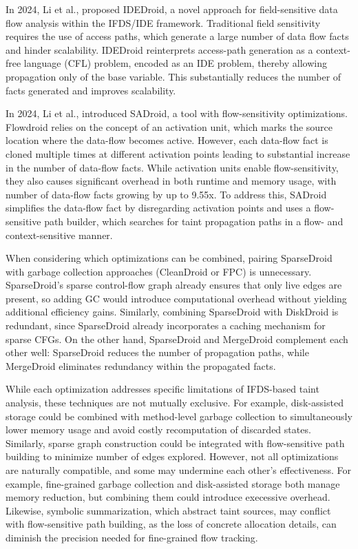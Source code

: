 In 2024, Li et al., \cite{li2024boosting} proposed IDEDroid, a novel approach for field-sensitive data flow analysis within the IFDS/IDE framework. 
Traditional field sensitivity requires the use of access paths, which generate a large number of data flow facts and hinder scalability. 
IDEDroid reinterprets access-path generation as a context-free language (CFL) problem, encoded as an IDE problem, thereby allowing propagation only of the base variable. 
This substantially reduces the number of facts generated and improves scalability.

In 2024, Li et al., \cite{li2024boostingmultisolver} introduced SADroid, a tool with flow-sensitivity optimizations. 
Flowdroid relies on the concept of an activation unit, which marks the source location where the data-flow becomes active.
However, each data-flow fact is cloned multiple times at different activation points leading to substantial increase in the number of data-flow facts.
While activation units enable flow-sensitivity, they also causes significant overhead in both runtime and memory usage, with number of data-flow facts growing by up to 9.55x.
To address this, SADroid simplifies the data-flow fact by disregarding activation points and uses a flow-sensitive path builder, which searches for taint propagation paths in a flow- and context-sensitive manner.


When considering which optimizations can be combined, pairing SparseDroid with garbage collection approaches (CleanDroid or FPC) is unnecessary. 
SparseDroid’s sparse control-flow graph already ensures that only live edges are present, so adding GC would introduce computational overhead without yielding additional efficiency gains. 
Similarly, combining SparseDroid with DiskDroid is redundant, since SparseDroid already incorporates a caching mechanism for sparse CFGs. 
On the other hand, SparseDroid and MergeDroid complement each other well: SparseDroid reduces the number of propagation paths, while MergeDroid eliminates redundancy within the propagated facts.

While each optimization addresses specific limitations of IFDS-based taint analysis, these techniques are not mutually exclusive.
For example, disk-assisted storage could be combined with method-level garbage collection to simultaneously lower memory usage and avoid costly recomputation of discarded states.
Similarly, sparse graph construction could be integrated with flow-sensitive path building to minimize number of edges explored.
However, not all optimizations are naturally compatible, and some may undermine each other's effectiveness. 
For example, fine-grained garbage collection and disk-assisted storage both manage memory reduction, but combining them could introduce execessive overhead.
Likewise, symbolic summarization, which abstract taint sources, may conflict with flow-sensitive path building, as the loss of concrete allocation details, can diminish the precision needed for fine-grained flow tracking. 